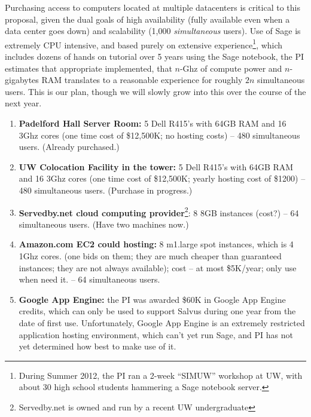\documentclass[11pt]{article}
\begin{document}
Purchasing access to computers located at multiple datacenters is
critical to this proposal, given the dual goals of high availability
(fully available even when a data center goes down) and scalability
(1,000 {\em simultaneous} users).  Use of Sage is extremely CPU
intensive, and based purely on extensive experience\footnote{During
  Summer 2012, the PI ran a 2-week ``SIMUW'' workshop at UW, with
  about 30 high school students hammering a Sage notebook server.},
which includes dozens of hands on tutorial over 5 years using the Sage
notebook, the PI estimates that appropriate implemented, that $n$-Ghz
of compute power and $n$-gigabytes RAM translates to a reasonable
experience for roughly $2n$ simultaneous users.  This is our plan,
though we will slowly grow into this over the course of the next year.

\begin{enumerate}
\item {\bf Padelford Hall Server Room:} 5 Dell R415's with 64GB RAM
  and 16 3Ghz cores (one time cost of \$12,500K; no hosting costs) --
  480 simultaneous users.   (Already purchased.)

\item {\bf UW Colocation Facility in the tower:} 5 Dell R415's with
  64GB RAM and 16 3Ghz cores (one time cost of \$12,500K; yearly
  hosting cost of \$1200) -- 480 simultaneous users.  (Purchase in progress.)

\item {\bf Servedby.net cloud computing
  provider}\footnote{Servedby.net is owned and run by a recent UW 
  undergraduate}: 8 8GB instances (cost?) -- 64 simultaneous users.
  (Have two machines now.)

\item {\bf Amazon.com EC2 could hosting:} 8 m1.large spot instances,
  which is 4 1Ghz cores. (one bids on them; they are much cheaper than
  guaranteed instances; they are not always available); cost -- at
  most \$5K/year; only use when need it. -- 64 simultaneous users.

\item {\bf Google App Engine:} the PI was awarded \$60K in Google App
  Engine credits, which can only be used to support Salvus during one
  year from the date of first use.  Unfortunately, Google App Engine
  is an extremely restricted application hosting environment, which
  can't yet run Sage, and PI has not yet determined how best to make
  use of it.
\end{enumerate}
\end{document}
